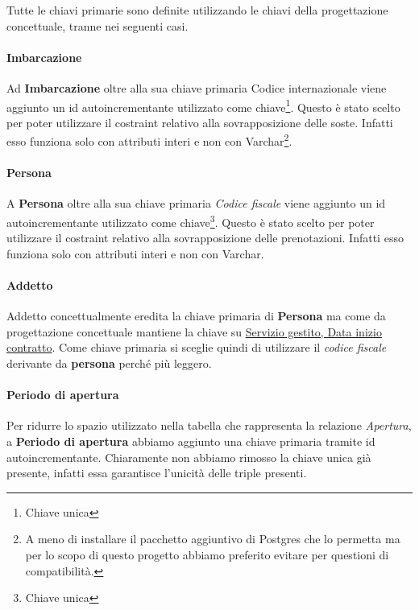 Tutte le chiavi primarie sono definite utilizzando le chiavi della progettazione concettuale, tranne nei seguenti casi.

\paragraph{Imbarcazione} Ad \textbf{Imbarcazione} oltre alla sua chiave primaria Codice internazionale viene aggiunto un id autoincrementante utilizzato come chiave\footnote{Chiave unica}. Questo è stato scelto per poter utilizzare il costraint relativo alla sovrapposizione delle soste. Infatti esso funziona solo con attributi interi e non con Varchar\footnote{A meno di installare il pacchetto aggiuntivo di Postgres che lo permetta ma per lo scopo di questo progetto abbiamo preferito evitare per questioni di compatibilità.}.

\paragraph{Persona} A \textbf{Persona} oltre alla sua chiave primaria \textit{Codice fiscale} viene aggiunto un id autoincrementante utilizzato come chiave\footnote{Chiave unica}. Questo è stato scelto per poter utilizzare il costraint relativo alla sovrapposizione delle prenotazioni. Infatti esso funziona solo con attributi interi e non con Varchar.

\paragraph{Addetto} Addetto concettualmente eredita la chiave primaria di \textbf{Persona} ma come da progettazione concettuale mantiene la chiave su \underline{Servizio gestito, Data inizio contratto}. Come chiave primaria si sceglie quindi di utilizzare il \textit{codice fiscale} derivante da \textbf{persona} perché più leggero.

\paragraph{Periodo di apertura} Per ridurre lo spazio utilizzato nella tabella che rappresenta la relazione \textit{Apertura}, a \textbf{Periodo di apertura} abbiamo aggiunto una chiave primaria tramite id autoincrementante. Chiaramente non abbiamo rimosso la chiave unica già presente, infatti essa garantisce l'unicità delle triple presenti.




